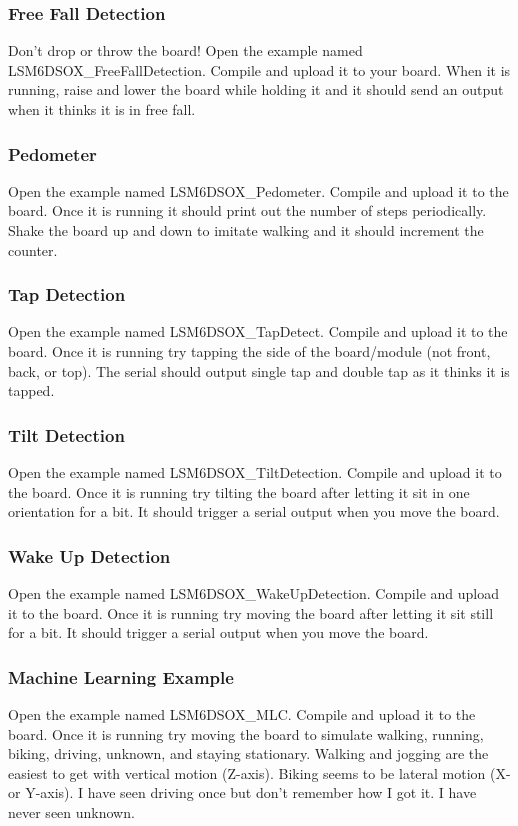 \subsubsection{Free Fall Detection}
Don't drop or throw the board! Open the example named LSM6DSOX\_FreeFallDetection. Compile 
and upload it to your board. When it is running, raise and lower the board while holding it 
and it should send an output when it thinks it is in free fall. 

\subsubsection{Pedometer}
Open the example named LSM6DSOX\_Pedometer. Compile and upload it to the board. Once it is 
running it should print out the number of steps periodically. Shake the board up and down 
to imitate walking and it should increment the counter.

\subsubsection{Tap Detection}
Open the example named LSM6DSOX\_TapDetect. Compile and upload it to the board. Once it is 
running try tapping the side of the board/module (not front, back, or top). The serial should 
output single tap and double tap as it thinks it is tapped.

\subsubsection{Tilt Detection}
Open the example named LSM6DSOX\_TiltDetection. Compile and upload it to the board. Once it is 
running try tilting the board after letting it sit in one orientation for a bit. It should 
trigger a serial output when you move the board.

\subsubsection{Wake Up Detection}
Open the example named LSM6DSOX\_WakeUpDetection. Compile and upload it to the board. Once it is 
running try moving the board after letting it sit still for a bit. It should trigger a serial 
output when you move the board.

\subsubsection{Machine Learning Example}
Open the example named LSM6DSOX\_MLC. Compile and upload it to the board. Once it is 
running try moving the board to simulate walking, running, biking, driving, unknown, and 
staying stationary. Walking and jogging are the easiest to get with vertical motion (Z-axis). 
Biking seems to be lateral motion (X- or Y-axis). I have seen driving once but don't remember 
how I got it. I have never seen unknown.

